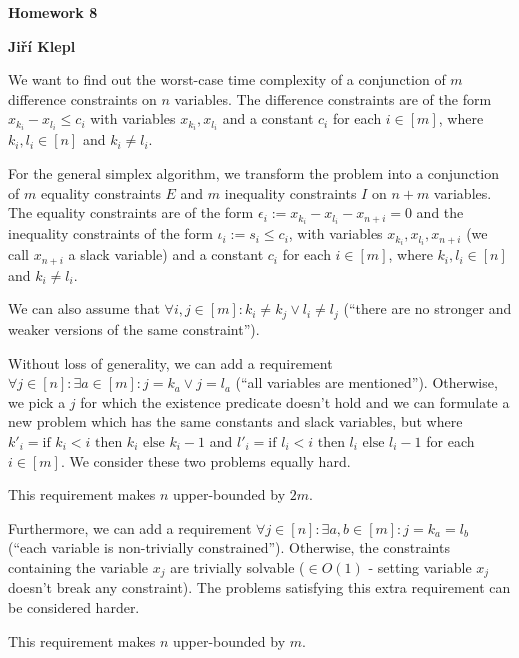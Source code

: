\documentclass[a4paper,12pt]{article} %
\begin{document}
\begin{center}
    {\Large \bf Homework 8}
    \vspace{2mm}

    {\bf Jiří Klepl}

\end{center}

\vspace{0.4cm}

We want to find out the worst-case time complexity of a conjunction of $m$ difference constraints on $n$ variables. The difference constraints are of the form $x_{k_i} - x_{l_i} \leq c_i$ with variables $x_{k_i}, x_{l_i}$ and a constant $c_i$ for each $i \in [m]$, where $k_i, l_i \in [n]$ and $k_i \neq l_i$.

For the general simplex algorithm, we transform the problem into a conjunction of $m$ equality constraints $E$ and $m$ inequality constraints $I$ on $n+m$ variables. The equality constraints are of the form $\epsilon_i := x_{k_i} - x_{l_i} - x_{n + i} = 0$ and the inequality constraints of the form $\iota_i := s_i \leq c_i$, with variables $x_{k_i}, x_{l_i}, x_{n  + i}$ (we call $x_{n + i}$ a slack variable) and a constant $c_i$ for each $i \in [m]$, where $k_i, l_i \in [n]$ and $k_i \neq l_i$.

We can also assume that $\forall i, j \in [m] : k_i \neq k_j \vee l_i \neq l_j$ (``there are no stronger and weaker versions of the same constraint'').

Without loss of generality, we can add a requirement $\forall j \in [n] : \exists a \in [m] : j = k_a \lor j = l_a$ (``all variables are mentioned''). Otherwise, we pick a $j$ for which the existence predicate doesn't hold and we can formulate a new problem which has the same constants and slack variables, but where $k'_i = \text{if } k_i < i \text { then } k_i \text{ else } k_i - 1$ and $l'_i = \text{if } l_i < i \text { then } l_i \text{ else } l_i - 1$ for each $i \in [m]$. We consider these two problems equally hard.

This requirement makes $n$ upper-bounded by $2m$.

Furthermore, we can add a requirement $\forall j \in [n] : \exists a, b \in [m] : j = k_a = l_b$ (``each variable is non-trivially constrained''). Otherwise, the constraints containing the variable $x_j$ are trivially solvable ($\in O(1)$ - setting variable $x_j$ doesn't break any constraint). The problems satisfying this extra requirement can be considered harder.

This requirement makes $n$ upper-bounded by $m$.
\end{document}

